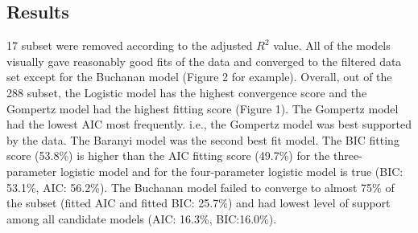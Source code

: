 \documentclass[a4paper,11pt]{article}
\theoremstyle{definition}
\begin{document}
\begin{linenumbers}
\section{Results}
17 subset were removed according to the adjusted $R^{2}$ value. All of the models visually gave reasonably good fits of the data and converged to the filtered data set except for the Buchanan model (Figure 2 for example). Overall, out of the 288 subset, the Logistic model has the highest convergence score and the Gompertz model had the highest fitting score (Figure 1). The Gompertz model had the lowest AIC most frequently. i.e., the Gompertz model was best supported by the data. The Baranyi model was the second best fit model. The BIC fitting score (53.8\%) is higher than the AIC fitting score (49.7\%) for the three-parameter logistic model and for the four-parameter logistic model is true (BIC: 53.1\%, AIC: 56.2\%). The Buchanan model failed to converge to almost 75\% of the subset (fitted AIC and fitted BIC: 25.7\%) and had lowest level of support among all candidate models (AIC: 16.3\%, BIC:16.0\%).
\begin{center}
\begin{table}[]
\caption {AIC and BIC fitting scores of candidate modesl}
\begin{threeparttable}


\end{threeparttable}
\end{table}
\end{center}
\end{linenumbers}
\end{document}
